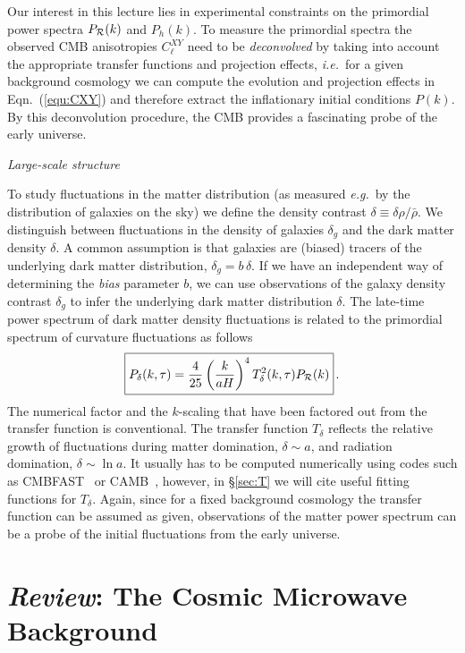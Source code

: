 \documentclass[12pt,letterpaper,rotate]{article}
\def\beq{\begin{equation}}
\def\eeq{\end{equation}}
\def\R{{\cal R}}
\begin{document}
{Our interest in this lecture lies in experimental constraints on the primordial power spectra $P_\R(k)$ and $P_h(k)$.
To measure the primordial spectra the observed CMB anisotropies $C_{\ell}^{XY}$ need to be {\it deconvolved} by taking into account the appropriate transfer functions and projection effects, {\it i.e.}~for a given background cosmology we can compute the evolution and projection effects in Eqn.~(\ref{equ:CXY}) and therefore extract the inflationary initial conditions $P(k)$. By this deconvolution procedure, the CMB provides a fascinating probe of the early universe.

\vskip 6pt
\noindent
{\it Large-scale structure}

To study fluctuations in the matter distribution (as measured {\it e.g.}~by the distribution of galaxies on the sky) we define the density contrast $\delta \equiv \delta \rho/ \bar \rho$.
We distinguish between fluctuations in the density of galaxies $\delta_g$ and the dark matter density $\delta$. A common assumption is that galaxies are (biased) tracers of the underlying dark matter distribution, $\delta_g = b\, \delta$.
If we have an independent way of determining the {\it bias} parameter $b$, we can use observations of the galaxy density contrast $\delta_g$ to infer the underlying dark matter distribution $\delta$.
The late-time power spectrum of dark matter density fluctuations is related to the primordial spectrum of curvature fluctuations as follows
\beq
\fbox{$\displaystyle
P_\delta(k, \tau) = \frac{4}{25} \left( \frac{k}{aH}\right)^4 T_\delta^2(k, \tau) P_\R(k)$}\, .
\eeq
The numerical factor and the $k$-scaling that have been factored out from the transfer function is conventional.
The transfer function $T_\delta$ reflects the relative growth of fluctuations during matter domination, $\delta \sim a$, and radiation domination, $\delta \sim \ln a$.
It usually has to be computed numerically using codes such as {\sf CMBFAST}~\cite{CMBFAST} or {\sf CAMB}~\cite{CAMB}, however, in \S\ref{sec:T} we will cite useful fitting functions for $T_\delta$.
Again, since for a fixed background cosmology the transfer function can be assumed as given, observations of the matter power spectrum can be a probe of the initial fluctuations from the early universe.


\section{{\sl Review}: The Cosmic Microwave Background}
\label{sec:CMB}


}
\end{document}
